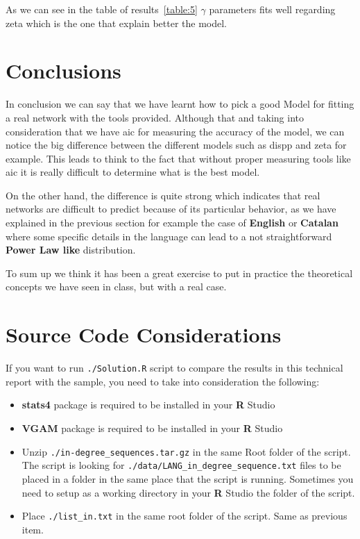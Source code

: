 \documentclass[12pt, a4paper]{article}
\begin{document}
As we can see in the table of results~\ref{table:5} $\gamma$ parameters fits well regarding \acrshort{zeta} which is the one
that explain better the model.

\section{Conclusions}
In conclusion we can say that we have learnt how to pick a good Model for fitting a real network with the tools provided. 
Although that and taking into consideration that we have \acrshort{aic} for measuring the accuracy of the model, we can notice the big difference
between the different models such as \acrshort{dispp} and \acrshort{zeta} for example.
This leads to think to the fact that without proper measuring tools like \acrshort{aic} it is really difficult to determine what is the best model. 

On the other hand, the difference is quite strong which indicates that real networks are difficult to predict because of its particular behavior, as we have
explained in the previous section for example the case of \textbf{English} or \textbf{Catalan} where some specific details in the language
can lead to a not straightforward \textbf{Power Law like} distribution.

To sum up we think it has been a great exercise to put in practice the theoretical concepts we have seen in class, but with a real case.

\printglossary[type=\acronymtype]

\appendix\label{apx:org}
\section{Source Code Considerations}
If you want to run \texttt{./Solution.R} script to compare the results in this technical report with the sample, you need to take into consideration the following:

\begin{itemize}
    \item \textbf{stats4} package is required to be installed in your \textbf{R} Studio
    \item \textbf{VGAM} package is required to be installed in your \textbf{R} Studio
    \item Unzip \texttt{./in-degree_sequences.tar.gz} in the same Root folder of the script. The script is looking for \texttt{./data/LANG_in_degree_sequence.txt} 
    files to be placed in a folder in the same place that the script is running. Sometimes you need to setup as a working directory in your \textbf{R} Studio the folder of the script.
    \item Place \texttt{./list_in.txt} in the same root folder of the script. Same as previous item.
\end{itemize}
\end{document}
